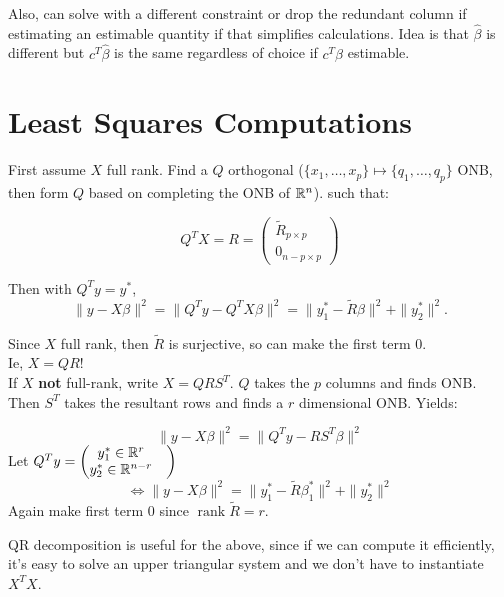 \documentclass{article}
\newcommand{\rank}{\operatorname{rank}}
\begin{document}
Also, can solve with a different constraint or drop the redundant column if estimating an estimable quantity if that simplifies calculations. Idea is that $\hat \beta$ is different but $c^T \hat \beta$ is the same regardless of choice if $c^T \beta$ estimable. 

\section{Least Squares Computations}
First assume $X$ full rank. Find a $Q$ orthogonal ($\{x_1,\ldots, x_p\} \mapsto \{q_1,\ldots, q_p\}$ ONB, then form $Q$ based on completing the ONB of $\mathbb R^n$).  such that:

$$Q^T X = R = \begin{pmatrix}
    \tilde R_{p\times p}\\
    0_{n-p \times p}
\end{pmatrix}$$

Then with $Q^T  y= y^*$,
$$\|y - X\beta \|^2 = \| Q^T y - Q^T X\beta \|^2  = \| y_1^* - \tilde R \beta \|^2 + \|y_2^*\|^2 .$$

Since $X$ full rank, then $\tilde R$ is surjective, so can make the first term $0$. \\
Ie, $X = QR$!\\ 
If $X$ \textbf{not} full-rank, write $X = QRS^T$. $Q$ takes the $p$ columns and finds ONB. Then $S^T$ takes the resultant rows and finds a $r$ dimensional ONB. Yields:

$$\|y-X\beta \|^2 = \| Q^T y - RS^T \beta\|^2 $$
Let $Q^T y = \begin{pmatrix}
    y_1^*\in \mathbb R^{r}&\\
    y_2^* \in \mathbb R^{n-r}
\end{pmatrix}$
$$\iff \|y-X\beta\|^2 = \|y_1^* - \tilde R \beta_1^*\|^2 + \|y_2^*\|^2 $$
Again make first term $0$ since $\rank \tilde R = r$.
\begin{fact}[Why QR?]
    QR decomposition is useful for the above, since if we can compute it efficiently, it's easy to solve an upper triangular system and we don't have to instantiate $X^T X$. 
\end{fact}
\end{document}
